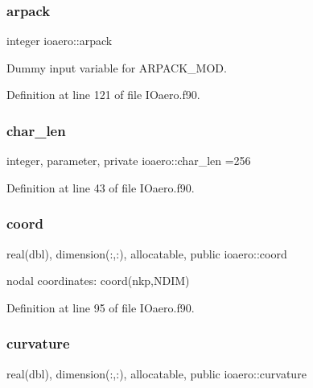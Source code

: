 \subsubsection{\texorpdfstring{arpack}{arpack}}
{\footnotesize\ttfamily integer ioaero\+::arpack\hspace{0.3cm}{\ttfamily [private]}}



Dummy input variable for A\+R\+P\+A\+C\+K\+\_\+\+M\+OD. 



Definition at line 121 of file I\+Oaero.\+f90.

\mbox{\label{namespaceioaero_acd6bdfdcfd986fd1c26261e5996e3b03}} 
\subsubsection{\texorpdfstring{char\+\_\+len}{char\_len}}
{\footnotesize\ttfamily integer, parameter, private ioaero\+::char\+\_\+len =256\hspace{0.3cm}{\ttfamily [private]}}



Definition at line 43 of file I\+Oaero.\+f90.

\mbox{\label{namespaceioaero_ad67cddc00712c4d5a6d4008b2fe6c452}} 
\subsubsection{\texorpdfstring{coord}{coord}}
{\footnotesize\ttfamily real(dbl), dimension(\+:,\+:), allocatable, public ioaero\+::coord}



nodal coordinates\+: coord(nkp,\+N\+D\+I\+M) 



Definition at line 95 of file I\+Oaero.\+f90.

\mbox{\label{namespaceioaero_ab2bc17b64328528015d161cab6490b80}} 
\subsubsection{\texorpdfstring{curvature}{curvature}}
{\footnotesize\ttfamily real(dbl), dimension(\+:,\+:), allocatable, public ioaero\+::curvature}



